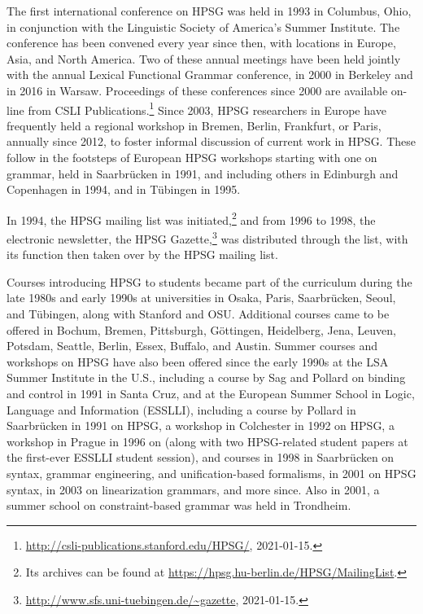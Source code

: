 \documentclass[output=paper
 	        ,biblatex
                ,babelshorthands
                ,newtxmath
                ,draftmode
                ,colorlinks, citecolor=brown
]{langscibook}
\begin{document}
The first international conference on HPSG was held in 1993 in Columbus, Ohio, in conjunction with the Linguistic Society of America's Summer Institute.  The conference has been convened every year since then, with locations in Europe, Asia, and North America.  Two of these annual meetings have been held jointly with the annual Lexical Functional Grammar conference, in 2000 in Berkeley and in 2016 in Warsaw.  Proceedings of these conferences since 2000 are available on-line from CSLI Publications.\footnote{\url{http://csli-publications.stanford.edu/HPSG/}, 2021-01-15.}  Since 2003, HPSG researchers in Europe have frequently held a regional workshop in Bremen, Berlin, Frankfurt, or Paris, annually since 2012, to foster informal discussion of current work in HPSG.  These follow in the footsteps of European HPSG workshops starting with one on  grammar, held in Saarbrücken in 1991, and including others in Edinburgh and Copenhagen in 1994, and in Tübingen in 1995.

In 1994, the HPSG mailing list was initiated,\footnote{Its archives can be found at \url{https://hpsg.hu-berlin.de/HPSG/MailingList}.} and from 1996 to 1998, the electronic newsletter, the HPSG Gazette,\footnote{\url{http://www.sfs.uni-tuebingen.de/~gazette}, 2021-01-15.} was distributed through the list, with its function then taken over by the HPSG mailing list.

Courses introducing HPSG to students became part of the curriculum during the late 1980s and early
1990s at universities in Osaka, Paris, Saarbrücken, Seoul, and Tübingen, along with Stanford
and OSU.  Additional courses came to be offered in Bochum, Bremen, Pittsburgh, Göttingen,
Heidelberg, Jena, Leuven, Potsdam, Seattle, Berlin, Essex, Buffalo, and Austin.  Summer courses and workshops on HPSG have also been offered since the early 1990s at the LSA Summer Institute in the U.S., including a course by Sag and Pollard on binding and control in 1991 in Santa Cruz, and at the European Summer School in Logic, Language and Information (ESSLLI), including a course by Pollard in Saarbrücken in 1991 on HPSG, a workshop in Colchester in 1992 on HPSG, a workshop in Prague in 1996 on  (along with two HPSG-related student papers at the first-ever ESSLLI student session), and courses in 1998 in Saarbrücken on  syntax, grammar engineering, and unification-based formalisms, in 2001 on HPSG syntax, in 2003 on linearization grammars, and more since.  Also in 2001, a  summer school on constraint-based grammar was held in Trondheim.
\end{document}
